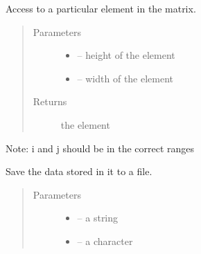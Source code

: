 \documentclass[letterpaper,10pt,english]{sphinxmanual}
\begin{document}
\begin{fulllineitems}

\begin{fulllineitems}
\label{\detokenize{index:dbm_py.interface.Matrix.get}}
Access to a particular element in the matrix.
\begin{quote}\begin{description}
\item[{Parameters}] \leavevmode\begin{itemize}
\item {} 
 -- height of the element

\item {} 
 -- width of the element

\end{itemize}

\item[{Returns}] \leavevmode
the element

\end{description}\end{quote}

Note: i and j should be in the correct ranges

\end{fulllineitems}


\begin{fulllineitems}
\label{\detokenize{index:dbm_py.interface.Matrix.save}}
Save the data stored in it to a file.
\begin{quote}\begin{description}
\item[{Parameters}] \leavevmode\begin{itemize}
\item {} 
 -- a string

\item {} 
 -- a character

\end{itemize}

\end{description}\end{quote}

\end{fulllineitems}


\end{fulllineitems}
\end{document}
